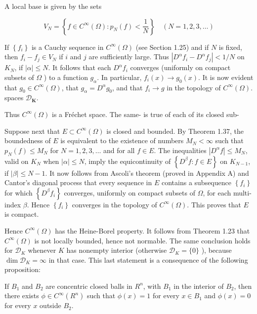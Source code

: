 \documentclass[10pt]{article}
\begin{document}
A local base is given by the sets

$$
V_{N}=\left\{f \in C^{\infty}(\Omega): p_{N}(f)<\frac{1}{N}\right\} \quad(N=1,2,3, \ldots)
$$

If $\left\{f_{i}\right\}$ is a Cauchy sequence in $C^{\infty}(\Omega)$ (see Section 1.25) and if $N$ is fixed, then $f_{i}-f_{j} \in V_{N}$ if $i$ and $j$ are sufficiently large. Thus $\left|D^{\alpha} f_{i}-D^{\alpha} f_{j}\right|<1 / N$ on $K_{N}$, if $|\alpha| \leq N$. It follows that each $D^{\alpha} f_{i}$ converges (uniformly on compact subsets of $\Omega$ ) to a function $g_{\alpha}$. In particular, $f_{i}(x) \rightarrow g_{0}(x)$. It is now evident that $g_{0} \in C^{\infty}(\Omega)$, that $g_{\alpha}=D^{\alpha} g_{0}$, and that $f_{i} \rightarrow g$ in the topology of $C^{\infty}(\Omega)$. spaces $\mathscr{D}_{\boldsymbol{K}}$.

Thus $C^{\infty}(\Omega)$ is a Fréchet space. The same- is true of each of its closed sub-

Suppose next that $E \subset C^{\infty}(\Omega)$ is closed and bounded. By Theorem 1.37, the boundedness of $E$ is equivalent to the existence of numbers $M_{N}<\infty$ such that $p_{N}(f) \leq M_{N}$ for $N=1,2,3, \ldots$ and for all $f \in E$. The inequalities $\left|D^{\alpha} f\right| \leq M_{N}$, valid on $K_{N}$ when $|\alpha| \leq N$, imply the equicontinuity of $\left\{D^{\beta} f: f \in E\right\}$ on $K_{N-1}$, if $|\beta| \leq N-1$. It now follows from Ascoli's theorem (proved in Appendix A) and Cantor's diagonal process that every sequence in $E$ contains a subsequence $\left\{f_{i}\right\}$ for which $\left\{D^{\beta} f_{i}\right\}$ converges, uniformly on compact subsets of $\Omega$, for each multi-index $\beta$. Hence $\left\{f_{i}\right\}$ converges in the topology of $C^{\infty}(\Omega)$. This proves that $E$ is compact.

Hence $C^{\infty}(\Omega)$ has the Heine-Borel property. It follows from Theorem 1.23 that $C^{\infty}(\Omega)$ is not locally bounded, hence not normable. The same conclusion holds for $\mathscr{D}_{K}$ whenever $K$ has nonempty interior (otherwise $\mathscr{D}_{K}=\{0\}$ ), because $\operatorname{dim} \mathscr{D}_{K}=\infty$ in that case. This last statement is a consequence of the following proposition:

If $B_{1}$ and $B_{2}$ are concentric closed balls in $R^{n}$, with $B_{1}$ in the interior of $B_{2}$, then there exists $\phi \in C^{\infty}\left(R^{n}\right)$ such that $\phi(x)=1$ for every $x \in B_{1}$ and $\phi(x)=0$ for every $x$ outside $B_{2}$.
\end{document}
